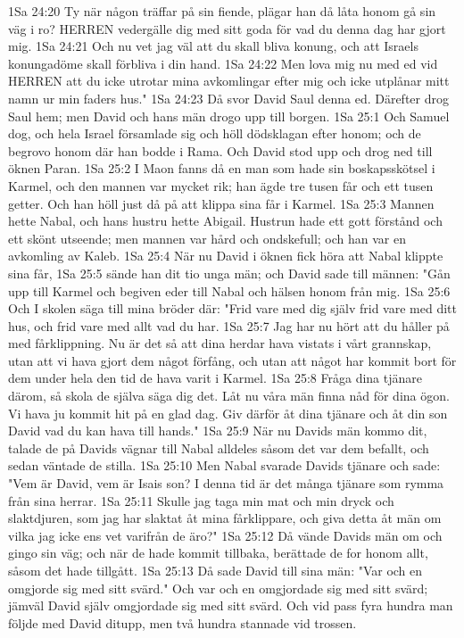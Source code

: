 1Sa 24:20  Ty när någon träffar på sin fiende, plägar han då låta honom gå sin väg i ro? HERREN vedergälle dig med sitt goda för vad du denna dag har gjort mig.
1Sa 24:21  Och nu vet jag väl att du skall bliva konung, och att Israels konungadöme skall förbliva i din hand.
1Sa 24:22  Men lova mig nu med ed vid HERREN att du icke utrotar mina avkomlingar efter mig och icke utplånar mitt namn ur min faders hus."
1Sa 24:23  Då svor David Saul denna ed. Därefter drog Saul hem; men David och hans män drogo upp till borgen.
1Sa 25:1  Och Samuel dog, och hela Israel församlade sig och höll dödsklagan efter honom; och de begrovo honom där han bodde i Rama. Och David stod upp och drog ned till öknen Paran.
1Sa 25:2  I Maon fanns då en man som hade sin boskapsskötsel i Karmel, och den mannen var mycket rik; han ägde tre tusen får och ett tusen getter. Och han höll just då på att klippa sina får i Karmel.
1Sa 25:3  Mannen hette Nabal, och hans hustru hette Abigail. Hustrun hade ett gott förstånd och ett skönt utseende; men mannen var hård och ondskefull; och han var en avkomling av Kaleb.
1Sa 25:4  När nu David i öknen fick höra att Nabal klippte sina får,
1Sa 25:5  sände han dit tio unga män; och David sade till männen: "Gån upp till Karmel och begiven eder till Nabal och hälsen honom från mig.
1Sa 25:6  Och I skolen säga till mina bröder där: "Frid vare med dig själv frid vare med ditt hus, och frid vare med allt vad du har.
1Sa 25:7  Jag har nu hört att du håller på med fårklippning. Nu är det så att dina herdar hava vistats i vårt grannskap, utan att vi hava gjort dem något förfång, och utan att något har kommit bort för dem under hela den tid de hava varit i Karmel.
1Sa 25:8  Fråga dina tjänare därom, så skola de själva säga dig det. Låt nu våra män finna nåd för dina ögon. Vi hava ju kommit hit på en glad dag. Giv därför åt dina tjänare och åt din son David vad du kan hava till hands."
1Sa 25:9  När nu Davids män kommo dit, talade de på Davids vägnar till Nabal alldeles såsom det var dem befallt, och sedan väntade de stilla.
1Sa 25:10  Men Nabal svarade Davids tjänare och sade: "Vem är David, vem är Isais son? I denna tid är det många tjänare som rymma från sina herrar.
1Sa 25:11  Skulle jag taga min mat och min dryck och slaktdjuren, som jag har slaktat åt mina fårklippare, och giva detta åt män om vilka jag icke ens vet varifrån de äro?"
1Sa 25:12  Då vände Davids män om och gingo sin väg; och när de hade kommit tillbaka, berättade de for honom allt, såsom det hade tillgått.
1Sa 25:13  Då sade David till sina män: "Var och en omgjorde sig med sitt svärd." Och var och en omgjordade sig med sitt svärd; jämväl David själv omgjordade sig med sitt svärd. Och vid pass fyra hundra man följde med David ditupp, men två hundra stannade vid trossen.
